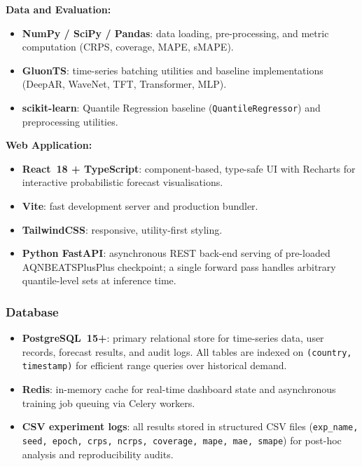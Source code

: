 \textbf{Data and Evaluation:}
\begin{itemize}
  \item \textbf{NumPy / SciPy / Pandas}: data loading, pre-processing,
        and metric computation (CRPS, coverage, MAPE, sMAPE).
  \item \textbf{GluonTS}: time-series batching utilities and baseline
        implementations (DeepAR, WaveNet, TFT, Transformer, MLP).
  \item \textbf{scikit-learn}: Quantile Regression baseline
        (\texttt{QuantileRegressor}) and preprocessing utilities.
\end{itemize}

\textbf{Web Application:}
\begin{itemize}
  \item \textbf{React~18 + TypeScript}: component-based, type-safe UI with
        Recharts for interactive probabilistic forecast visualisations.
  \item \textbf{Vite}: fast development server and production bundler.
  \item \textbf{TailwindCSS}: responsive, utility-first styling.
  \item \textbf{Python FastAPI}: asynchronous REST back-end serving of
        pre-loaded AQNBEATSPlusPlus checkpoint; a single forward pass handles
        arbitrary quantile-level sets at inference time.
\end{itemize}

\subsubsection{Database}
\label{subsubsec:database}

\begin{itemize}
  \item \textbf{PostgreSQL~15+}: primary relational store for time-series
        data, user records, forecast results, and audit logs.
        All tables are indexed on \texttt{(country, timestamp)} for
        efficient range queries over historical demand.
  \item \textbf{Redis}: in-memory cache for real-time dashboard state
        and asynchronous training job queuing via Celery workers.
  \item \textbf{CSV experiment logs}: all results stored in structured
        CSV files (\texttt{exp\_name, seed, epoch, crps, ncrps, coverage,
        mape, mae, smape}) for post-hoc analysis and reproducibility audits.
\end{itemize}

